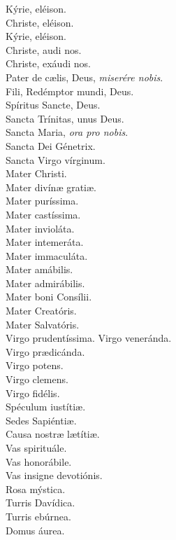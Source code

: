 \documentclass[./rosary.tex]{subfiles}
\begin{document}
\begin{multicols}{2}
    Kýrie, eléison.\\
    Christe, eléison.\\
    Kýrie, eléison.\\
    Christe, audi nos.\\
    Christe, exáudi nos.\\
    Pater de cælis, Deus, \emph{miserére nobis}.\\
    Fili, Redémptor mundi, Deus.\\
    Spíritus Sancte, Deus.\\
    Sancta Trínitas, unus Deus.\\
    Sancta Maria, \emph{ora pro nobis}.\\
    Sancta Dei Génetrix.\\
    Sancta Virgo vírginum.\\
    Mater Christi.\\
    Mater divínæ gratiæ.\\
    Mater puríssima.\\
    Mater castíssima.\\
    Mater invioláta.\\
    Mater intemeráta.\\
    Mater immaculáta.\\
    Mater amábilis.\\
    Mater admirábilis.\\
    Mater boni Consílii.\\
    Mater Creatóris.\\
    Mater Salvatóris.\\
    Virgo pru­den­tíssima.
    Virgo veneránda.\\
    Virgo prædicánda.\\
    Virgo potens.\\
    Virgo clemens.\\
    Virgo fidélis.\\
    Spéculum iustítiæ.\\
    Sedes Sapiéntiæ.\\
    Causa nostræ lætítiæ.\\
    Vas spirituále.\\
    Vas honorábile.\\
    Vas insigne devotiónis.\\
    Rosa mýstica.\\
    Turris Davídica.\\
    Turris ebúrnea.\\
    Domus áurea.\\

\end{multicols}
\end{document}

